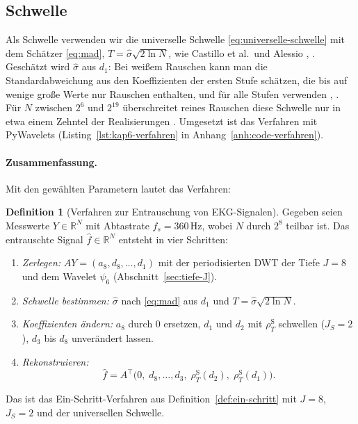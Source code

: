 \documentclass[a4paper,11pt,bibliography=totoc,listof=totoc,headinclude=true,cleardoublepage=empty,oneside]{scrbook}
\theoremstyle{plain}
\theoremstyle{definition}
\newtheorem{Definition}[Satz]{Definition}
\newcommand{\R}{\mathbb{R}}
\begin{document}
\subsection{Schwelle}

Als Schwelle verwenden wir die universelle Schwelle
\eqref{eq:universelle-schwelle} mit dem Schätzer \eqref{eq:mad},
$T = \hat\sigma\sqrt{2\ln N}$, wie Castillo et al.\ und Alessio
\cite[Abschn.~3.1.4, Gl.~(10); 3.1.5, Gl.~(19), (23)]{castillo}, %
\cite[Kap.~15.2.2, 15.2.3]{alessio}. %
Geschätzt wird $\hat\sigma$ aus $d_1$: Bei wei\ss em Rauschen kann man die Standardabweichung aus den Koeffizienten
der ersten Stufe schätzen, die bis auf wenige gro\ss e Werte nur Rauschen
enthalten, und für alle Stufen verwenden 
\cite[Abschn.~3.1.5]{castillo}, %
\cite[Kap.~15.2.2]{alessio}. %
Für $N$ zwischen $2^6$ und $2^{19}$ überschreitet reines Rauschen diese
Schwelle nur in etwa einem Zehntel der Realisierungen
\cite[Kap.~15.2.3]{alessio}. %
Umgesetzt ist das Verfahren mit PyWavelets \cite{pywavelets}
(Listing~\ref{lst:kap6-verfahren} in Anhang~\ref{anh:code-verfahren}).

\paragraph{Zusammenfassung.}
Mit den gewählten Parametern lautet das Verfahren:

\begin{Definition}[Verfahren zur Entrauschung von EKG-Signalen]
\label{def:verfahren}
Gegeben seien Messwerte $Y\in\R^N$ mit Abtastrate $f_s = 360$\,Hz, wobei
$N$ durch $2^8$ teilbar ist. Das entrauschte Signal $\hat f\in\R^N$ entsteht
in vier Schritten:
\begin{enumerate}
\item \emph{Zerlegen:} $AY = (a_8, d_8, \dots, d_1)$ mit der periodisierten
  DWT der Tiefe $J = 8$ und dem Wavelet $\psi_6$ (Abschnitt~\ref{sec:tiefe-J}).
\item \emph{Schwelle bestimmen:}
  $\hat\sigma$ nach \eqref{eq:mad} aus $d_1$ und
  $T = \hat\sigma\sqrt{2\ln N}$.
\item \emph{Koeffizienten ändern:} $a_8$ durch $0$ ersetzen, $d_1$ und $d_2$
  mit $\rho^{\mathrm S}_T$ schwellen ($J_S = 2$), $d_3$ bis $d_8$ unverändert
  lassen.
\item \emph{Rekonstruieren:}
  \[
    \hat f = A^\top\bigl(0,\; d_8, \dots, d_3,\;
    \rho^{\mathrm S}_T(d_2),\; \rho^{\mathrm S}_T(d_1)\bigr).
  \]
\end{enumerate}
Das ist das Ein-Schritt-Verfahren aus Definition~\ref{def:ein-schritt} mit
$J = 8$, $J_S = 2$ und der universellen Schwelle.
\end{Definition}
\end{document}
